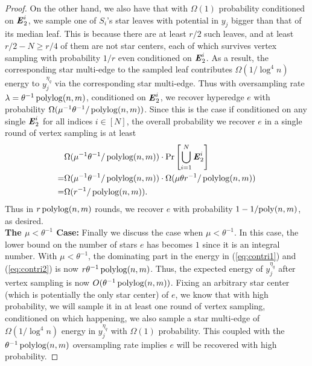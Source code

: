 \documentclass{article}
\begin{document}
\begin{proof}
    On the other hand, we also have that with $\Omega(1)$ probability
    conditioned on $\boldsymbol{\mathit{E}}_2^i$,
    we sample one of $S_i$'s star leaves with potential in $y_j$
    bigger than that of its median leaf.
    This is because there are at least $r/2$ such leaves,
    and at least $r/2 - N \geq r/4$ of them are not star centers,
    each of which survives vertex sampling with probability $1/r$ even conditioned
    on $\boldsymbol{\mathit{E}}_2^i$.
    As a result, the corresponding star multi-edge to the sampled leaf
    contributes $\Omega(1/\log^4 n)$ energy
    to $y_j^{\eta_q}$
    via the corresponding star multi-edge.
    Thus with oversampling rate $\lambda = \theta^{-1}\operatorname{polylog}(n,m)$,
    conditioned on $\boldsymbol{\mathit{E}}_2^i$,
    we recover hyperedge $e$ with probability
    $\Omega(\mu^{-1}\theta^{-1}/\operatorname{polylog}(n,m))$.
    Since this is the case if conditioned on any single $\boldsymbol{\mathit{E}}_2^i$
    for all indices $i\in [N]$,
    the overall probability we recover $e$
    in a single round of vertex sampling
    is at least
    \begin{align*}
        & \Omega(\mu^{-1}\theta^{-1}/\operatorname{polylog}(n,m))
        \cdot \mathrm{Pr}\left[ \bigcup_{i=1}^{N} \boldsymbol{\mathit{E}}_2^i \right] \\ =
        & \Omega(\mu^{-1}\theta^{-1}/\operatorname{polylog}(n,m))\cdot
        \Omega(\mu\theta r^{-1} / \operatorname{polylog}(n,m)) \\ =
        & \Omega(r^{-1}/\operatorname{polylog}(n,m)).
    \end{align*}
    Thus in $r\operatorname{polylog}(n,m)$ rounds, we recover $e$ with probability
    $1 - 1/\mathrm{poly}(n,m)$, as desired.\\[5pt]

\noindent \textbf{The $\mu < \theta^{-1}$ Case:}
    Finally we discuss the case when $\mu < \theta^{-1}$. In this case,
    the lower bound on the number of stars $e$ has becomes $1$ since it is an integral number.
    With $\mu < \theta^{-1}$, the dominating part in the energy
    in (\ref{eq:contri1}) and (\ref{eq:contri2}) is now $r\theta^{-1}\operatorname{polylog}(n,m)$.
    Thus, the expected energy of $y_j^{\eta_q}$
    after vertex sampling is now $O(\theta^{-1}\operatorname{polylog}(n,m))$.
    Fixing an arbitrary star center (which is potentially the only star center) of $e$,
    we know that with high probability, we will sample it in at least one
    round of vertex sampling, conditioned on which happening, we also
    sample a star multi-edge of $\Omega(1/\log^4 n)$ energy
    in $y_j^{\eta_q}$
    with $\Omega(1)$ probability.
    This coupled with the $\theta^{-1} \operatorname{polylog}(n,m)$ oversampling rate
    implies $e$ will be recovered with high probability.
\end{proof}
\end{document}
